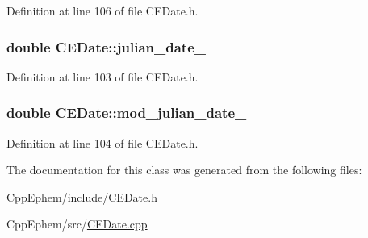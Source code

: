 Definition at line 106 of file C\+E\+Date.\+h.

\hypertarget{class_c_e_date_a58170c23976d025cd631d42b10b8930c}{}
\subsubsection[{julian\+\_\+date\+\_\+}]{\setlength{\rightskip}{0pt plus 5cm}double C\+E\+Date\+::julian\+\_\+date\+\_\+\hspace{0.3cm}{\ttfamily [protected]}}\label{class_c_e_date_a58170c23976d025cd631d42b10b8930c}


Definition at line 103 of file C\+E\+Date.\+h.

\hypertarget{class_c_e_date_aa713ba7b4c88ce0d453d18fb756cc645}{}
\subsubsection[{mod\+\_\+julian\+\_\+date\+\_\+}]{\setlength{\rightskip}{0pt plus 5cm}double C\+E\+Date\+::mod\+\_\+julian\+\_\+date\+\_\+\hspace{0.3cm}{\ttfamily [protected]}}\label{class_c_e_date_aa713ba7b4c88ce0d453d18fb756cc645}


Definition at line 104 of file C\+E\+Date.\+h.



The documentation for this class was generated from the following files\+:\begin{DoxyCompactItemize}
\item 
Cpp\+Ephem/include/\hyperlink{_c_e_date_8h}{C\+E\+Date.\+h}\item 
Cpp\+Ephem/src/\hyperlink{_c_e_date_8cpp}{C\+E\+Date.\+cpp}\end{DoxyCompactItemize}
